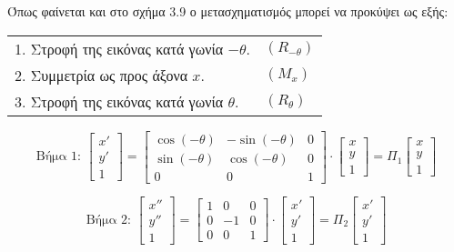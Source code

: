 %


 Όπως φαίνεται και στο σχήμα 3.9 ο μετασχηματισμός μπορεί να προκύψει ως εξής:
 
\begin{tabular}{m{}m{}}
1. Στροφή της εικόνας κατά γωνία \( -\theta \). & \( (R_{-\theta}) \) \\
2. Συμμετρία ως προς άξονα $x$.& \( (M_x) \)\\
3.  Στροφή της εικόνας κατά γωνία \( \theta \).& \( (R_{\theta}) \)
\end{tabular}


\[
\text{Βήμα 1: } 
\begin{bmatrix}
x' \\ y' \\ 1
\end{bmatrix}
=
\begin{bmatrix}
\cos(-\theta) & -\sin(-\theta) & 0 \\
\sin(-\theta) & \cos(-\theta) & 0 \\
0 & 0 & 1
\end{bmatrix}
\cdot
\begin{bmatrix}
x \\ y \\ 1
\end{bmatrix}
= \Pi_1
\begin{bmatrix}
x \\ y \\ 1
\end{bmatrix}
\]

\[
\text{Βήμα 2: } 
\begin{bmatrix}
x'' \\ y'' \\ 1
\end{bmatrix}
=
\begin{bmatrix}
1 & 0 & 0 \\
0 & -1 & 0 \\
0 & 0 & 1
\end{bmatrix}
\cdot
\begin{bmatrix}
x' \\ y' \\ 1
\end{bmatrix}
= \Pi_2
\begin{bmatrix}
x' \\ y' \\ 1
\end{bmatrix}
\]

